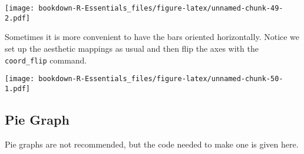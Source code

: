 \documentclass[]{book}
\newenvironment{Shaded}{\begin{snugshade}}{\end{snugshade}}
\newcommand{\KeywordTok}[1]{\textcolor[rgb]{0.13,0.29,0.53}{\textbf{#1}}}
\newcommand{\DataTypeTok}[1]{\textcolor[rgb]{0.13,0.29,0.53}{#1}}
\newcommand{\DecValTok}[1]{\textcolor[rgb]{0.00,0.00,0.81}{#1}}
\newcommand{\StringTok}[1]{\textcolor[rgb]{0.31,0.60,0.02}{#1}}
\newcommand{\CommentTok}[1]{\textcolor[rgb]{0.56,0.35,0.01}{\textit{#1}}}
\newcommand{\OperatorTok}[1]{\textcolor[rgb]{0.81,0.36,0.00}{\textbf{#1}}}
\newcommand{\NormalTok}[1]{#1}
\begin{document}
\texttt{[image: bookdown-R-Essentials\_files/figure-latex/unnamed-chunk-49-2.pdf]}

Sometimes it is more convenient to have the bars oriented horizontally.
Notice we set up the aesthetic mappings as usual and then flip the axes
with the \texttt{coord\_flip} command.

\begin{Shaded}
\end{Shaded}

\texttt{[image: bookdown-R-Essentials\_files/figure-latex/unnamed-chunk-50-1.pdf]}

\subsection{Pie Graph}\label{pie-graph}

Pie graphs are not recommended, but the code needed to make one is given
here.
\end{document}
